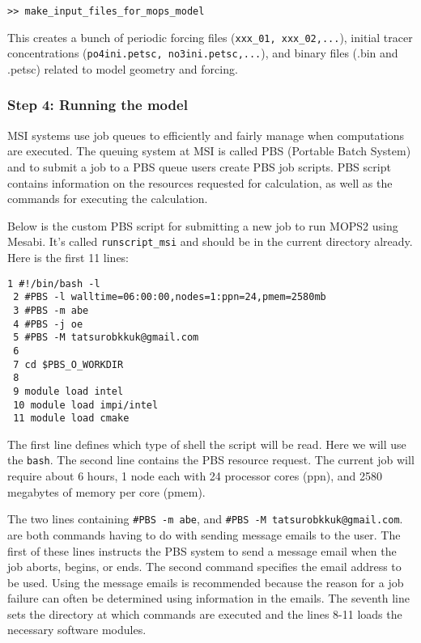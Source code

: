 \documentclass[a4paper]{article}
\def\noin{\noindent }
\begin{document}
\begin{enumerate}
\begin{lstlisting}[style=DOS]
>> make_input_files_for_mops_model
\end{lstlisting}
\noin This creates a bunch of periodic forcing files (\verb|xxx_01, xxx_02,...|), initial tracer concentrations (\verb|po4ini.petsc, no3ini.petsc,...|), and binary files (.bin and .petsc) related to model geometry and forcing.
\end{enumerate}

\subsubsection{Step 4: Running the model}
\noin MSI systems use job queues to efficiently and fairly manage when computations are executed. The queuing system at MSI is called PBS (Portable Batch System) and to submit a job to a PBS queue users create PBS job scripts. PBS script contains information on the resources requested for calculation, as well as the commands for executing the calculation. 

\vspace{5mm}
\noin Below is the custom PBS script for submitting a new job to run MOPS2 using Mesabi. It's called \verb|runscript_msi| and should be in the current directory already. Here is the first 11 lines:

\lstset{language=sh} 
\begin{lstlisting}[frame=single,basicstyle=\scriptsize]
 1 #!/bin/bash -l
 2 #PBS -l walltime=06:00:00,nodes=1:ppn=24,pmem=2580mb
 3 #PBS -m abe
 4 #PBS -j oe
 5 #PBS -M tatsurobkkuk@gmail.com
 6
 7 cd $PBS_O_WORKDIR
 8
 9 module load intel
 10 module load impi/intel
 11 module load cmake
 \end{lstlisting}

\noin The first line defines which type of shell the script will be read. Here we will use the \verb|bash|. The second line contains the PBS resource request. The current job will require about 6 hours, 1 node each with 24 processor cores (ppn), and 2580 megabytes of memory per core (pmem). 

The two lines containing \verb|#PBS -m abe|, and \verb|#PBS -M tatsurobkkuk@gmail.com|. are both commands having to do with sending message emails to the user.  The first of these lines instructs the PBS system to send a message email when the job aborts, begins, or ends.  The second command specifies the email address to be used.  Using the message emails is recommended because the reason for a job failure can often be determined using information in the emails. The seventh line sets the directory at which commands are executed and the lines 8-11 loads the necessary software modules. 
\end{document}
